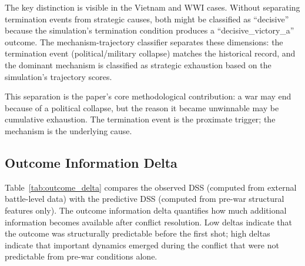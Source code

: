 The key distinction is visible in the Vietnam and WWI cases. Without separating termination events from strategic causes, both might be classified as ``decisive'' because the simulation's termination condition produces a ``decisive\_victory\_a'' outcome. The mechanism-trajectory classifier separates these dimensions: the termination event (political/military collapse) matches the historical record, and the dominant mechanism is classified as strategic exhaustion based on the simulation's trajectory scores.

This separation is the paper's core methodological contribution: a war may end because of a political collapse, but the reason it became unwinnable may be cumulative exhaustion. The termination event is the proximate trigger; the mechanism is the underlying cause.

\subsection{Outcome Information Delta}

Table~\ref{tab:outcome_delta} compares the observed DSS (computed from external battle-level data) with the predictive DSS (computed from pre-war structural features only). The outcome information delta quantifies how much additional information becomes available after conflict resolution. Low deltas indicate that the outcome was structurally predictable before the first shot; high deltas indicate that important dynamics emerged during the conflict that were not predictable from pre-war conditions alone.

